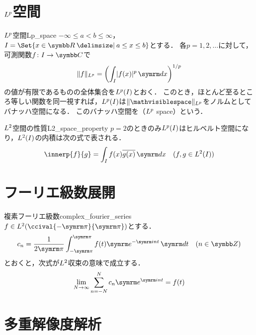\documentclass[../../main]{subfiles}
\begin{document}
\section{\texorpdfstring{\(L^p\)}{Lp}空間}
\label{section:lp_space}

\begin{definition}{\(L^p\)空間}{Lp_space}
  \(-\infty\leq a<b\leq\infty\)，\(I=\Set{x\in\numset{R}\given a\leq x\leq b}\)とする\footnotemark ．
  各\(p=1,2,\dotsc\)に対して，可測関数\(f\colon I\to\numset{C}\)で
  \[
    \vnorm{f}_{\Lebesgue{p}} = \pqty*{\int_I\abs{f(x)}^p\intd{x}}^{1/p}
  \]
  の値が有限であるものの全体集合を\(L^p(I)\)とおく．
  このとき，ほとんど至るところ等しい関数を同一視すれば，\(L^p(I)\)は\(\vnorm{\holder}_{\Lebesgue{p}}\)をノルムとしてバナッハ空間になる．
  このバナッハ空間を（\(L^p\) space）という．
\end{definition}

\begin{proposition}{\(L^2\)空間の性質}{L2_space_property}
  \(p=2\)のときのみ\(L^p(I)\)はヒルベルト空間になり，\(L^2(I)\)の内積は次の式で表される．
  \[
    \innerp{f}{g} = \int_If(x)\conj{g(x)}\intd{x}\quad(f,g\in\Lebesgue{2}(I))
  \]
\end{proposition}


\section{フーリエ級数展開}

\begin{definition}{複素フーリエ級数}{complex_fourier_series}
  \(f\in\Lebesgue{2}(\ccival{-\krez}{\krez})\)とする．
  \[
    c_n = \frac{1}{2\krez}\int_{-\krez}^{\krez}f(t)\napr^{-\iuni nt}\intd{t}\quad(n\in\numset{Z})
  \]
  とおくと，次式が\(L^2\)収束の意味で成立する．
  \[
    \lim_{N\to\infty}\sum_{n=-N}^Nc_n\napr^{\iuni nt} = f(t)
  \]
\end{definition}

\section{多重解像度解析}
\end{document}
